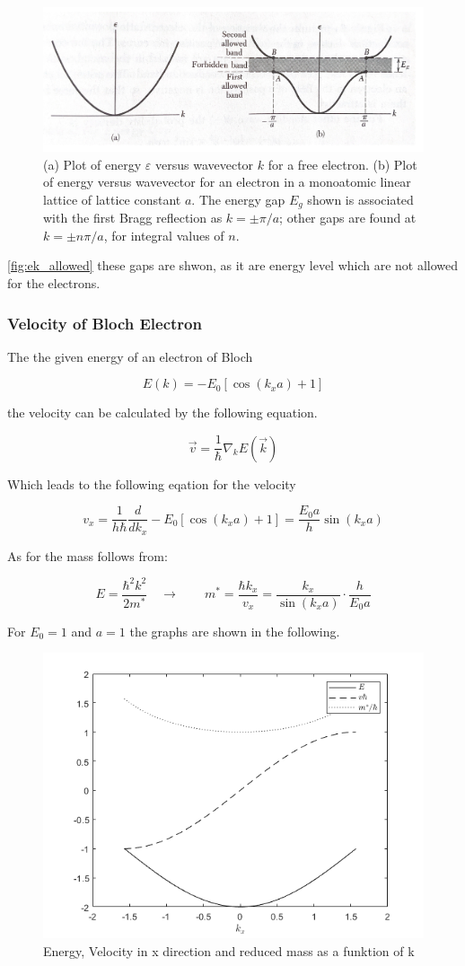 \begin{figure}[H]
  \centering
  \includegraphics[width=0.6\linewidth]{Graphics/Chapter2/ek_allowed.png}
  \caption{(a) Plot of energy $\varepsilon$ versus wavevector $k$ for a free electron. (b) Plot of energy versus wavevector for an electron in a monoatomic
  linear lattice of lattice constant $a$. The energy gap $E_g$ shown is associated with the first Bragg reflection as $k=\pm \pi/a$; other gaps 
  are found at $k=\pm n\pi/a$, for integral values of $n$.
  \cite[Introduction to  Solid State Physics p. 177]{kittel} }
  \label{fig:ek_allowed}
\end{figure}

\autoref{fig:ek_allowed} these gaps are shwon, as it are energy level
which are not allowed for the electrons.

\subsubsection*{Velocity of Bloch Electron}

The the given energy of an electron of Bloch 

$$E(k) =  -E_0\left[\cos(k_xa)+1\right]$$ 
 
the velocity can be calculated by the following equation.

$$\vec{v} = \frac{1}{\hbar} \nabla_k E(\vec{k})$$

Which leads to the following eqation for the velocity

$$v_x = \frac{1}{h\hbar} \frac{d}{dk_x} -E_0\left[\cos(k_xa)+1\right] = \frac{E_0a}{h} \sin(k_xa)$$

As for the mass follows from:

$$E = \frac{\hbar^2k^2}{2m^*} \quad \rightarrow \qquad m^* = \frac{\hbar k_x}{v_x}  = \frac{k_x}{\sin(k_xa)} \cdot \frac{h}{E_0a}$$

For $E_0 = 1$ and $a=1$ the graphs are shown in the following.

\begin{figure}[H]
    \centering
    \includegraphics[width=0.5\linewidth]{Graphics/Chapter2/E_of_K.png}
    \caption{Energy, Velocity in x direction and reduced mass as a funktion of k}
    \label{fig:PNjunction}
  \end{figure}
